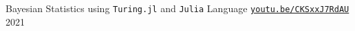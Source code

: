 

\begin{cventries}

  \cventry
    {} %
    {Bayesian Statistics using \texttt{Turing.jl} and \texttt{Julia} Language} %
    {\href{https://youtu.be/CKSxxJ7RdAU}{\texttt{youtu.be/CKSxxJ7RdAU}}} %
    {2021} %
    {}

\end{cventries}
